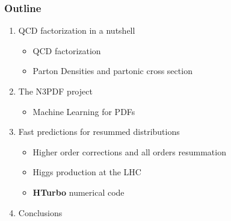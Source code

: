 \documentclass[aspectratio=43]{beamer}
\begin{document}
\begin{frame}

	\frametitle{Outline}
	
	\begin{enumerate}
		\item {\color{blue}QCD factorization in a nutshell}
		\begin{itemize}
			\item QCD factorization
			\item Parton Densities and partonic cross section
		\end{itemize}
		\item {\color{blue}The N3PDF project}
		\begin{itemize}	
			\item Machine Learning for PDFs
		\end{itemize}	
		\item {\color{blue}Fast predictions for resummed distributions}
		\begin{itemize}
			\item Higher order corrections and all orders resummation
			\item Higgs production at the LHC
			\item \textbf{HTurbo} numerical code
		\end{itemize}
		\item {\color{blue}Conclusions}
	\end{enumerate}
	
\end{frame}

\begin{frame}


\end{frame}
\end{document}
